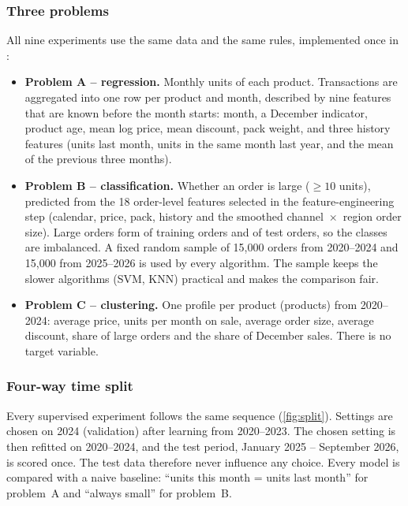 \subsubsection{Three problems}
All nine experiments use the same data and the same rules, implemented once in
:
\begin{itemize}
  \item \textbf{Problem A -- regression.} Monthly units of each product. Transactions are aggregated into one row
        per product and month, described by nine features that are known before the month starts: month, a
        December indicator, product age, mean log price, mean discount, pack weight, and three history features
        (units last month, units in the same month last year, and the mean of the previous three months).
  \item \textbf{Problem B -- classification.} Whether an order is large ($\geq 10$ units), predicted from the 18
        order-level features selected in the feature-engineering step (calendar, price, pack, history and the
        smoothed channel~$\times$~region order size). Large orders form \LargeShareTrain of training orders and
        \LargeShareTest of test orders, so the classes are imbalanced. A fixed random sample of 15,000 orders
        from 2020--2024 and 15,000 from 2025--2026 is used by every algorithm. The sample keeps the slower
        algorithms (SVM, KNN) practical and makes the comparison fair.
  \item \textbf{Problem C -- clustering.} One profile per product (\KMProducts products) from 2020--2024: average
        price, units per month on sale, average order size, average discount, share of large orders and the
        share of December sales. There is no target variable.
\end{itemize}

\subsubsection{Four-way time split}
Every supervised experiment follows the same sequence (\cref{fig:split}). Settings are chosen on 2024
(validation) after learning from 2020--2023. The chosen setting is then refitted on 2020--2024, and the test
period, January 2025 -- September 2026, is scored once. The test data therefore never influence any choice.
Every model is compared with a naive baseline: ``units this month = units last month'' for problem~A and
``always small'' for problem~B.

